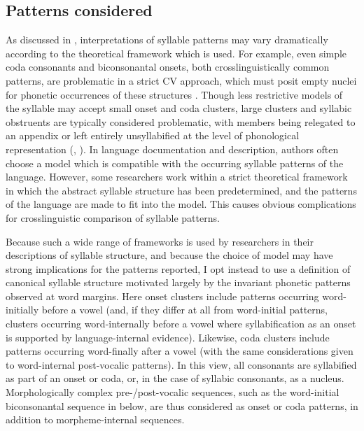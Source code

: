 \subsection{Patterns considered}\label{sec:3.2.1}

  As discussed in , interpretations of syllable patterns may vary dramatically according to the theoretical framework which is used. For example, even simple coda consonants and biconsonantal onsets, both crosslinguistically common patterns, are problematic in a strict CV approach, which must posit empty nuclei for phonetic occurrences of these structures \citep{Lowenstamm1996}. Though less restrictive models of the syllable may accept small onset and coda clusters, large clusters and syllabic obstruents are typically considered problematic, with members being relegated to an appendix or left entirely unsyllabified at the level of phonological representation (\citealt{VauxWolfe2009}, \citealt{Bagemihl1991}). In language documentation and description, authors often choose a model which is compatible with the occurring syllable patterns of the language. However, some researchers work within a strict theoretical framework in which the abstract syllable structure has been predetermined, and the patterns of the language are made to fit into the model. This causes obvious complications for crosslinguistic comparison of syllable patterns.

  Because such a wide range of frameworks is used by researchers in their descriptions of syllable structure, and because the choice of model may have strong implications for the patterns reported, I opt instead to use a definition of canonical syllable structure motivated largely by the invariant phonetic patterns observed at word margins. Here onset clusters include patterns occurring word-initially before a vowel (and, if they differ at all from word-initial patterns, clusters occurring word-internally before a vowel where syllabification as an onset is supported by language-internal evidence). Likewise, coda clusters include patterns occurring word-finally after a vowel (with the same considerations given to word-internal post-vocalic patterns). In this view, all consonants are syllabified as part of an onset or coda, or, in the case of syllabic consonants, as a nucleus. Morphologically complex pre-/post-vocalic sequences, such as the word-initial biconsonantal sequence in  below, are thus considered as onset or coda patterns, in addition to morpheme-internal sequences.

